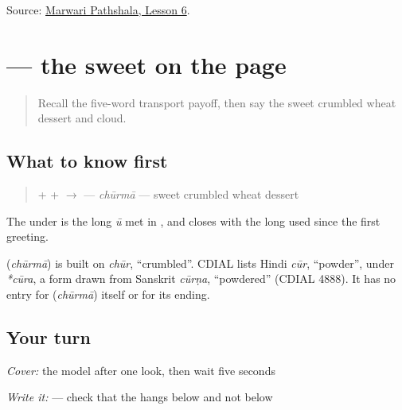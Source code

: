 \begin{tcolorbox}[breakable,colback=teal!4,colframe=teal!35!black,title={Before you move on}]
Source: \href{https://www.marwaripathshala.com/marwari-lesson-6-english}{Marwari Pathshala, Lesson 6}.
\end{tcolorbox}
\section[\texorpdfstring{\mw{चूरमा} (chūrmā)}{चूरमा (chūrmā)}]{ — the sweet on the page}

\label{lesson:MW-C20-churma}



\begin{quote}
Recall the five-word transport payoff, then say the sweet crumbled wheat dessert and cloud.
\end{quote}

\subsection*{What to know first}
\begin{quote}
\textbf{} + \textbf{} + \textbf{} $\to$ \textbf{} — \emph{chūrmā} — sweet crumbled wheat dessert
\end{quote}

The \textbf{} under \textbf{} is the long \emph{ū} met in \textbf{}, and \textbf{} closes with the long \textbf{} used since the first greeting.

\begin{cousinweb}
\textbf{} (\emph{chūrmā}) is built on \emph{chūr}, \textquotedblleft{}crumbled\textquotedblright{}. CDIAL lists Hindi \emph{cūr}, \textquotedblleft{}powder\textquotedblright{}, under \emph{*cūra}, a form drawn from Sanskrit \emph{cūrṇa}, \textquotedblleft{}powdered\textquotedblright{} (CDIAL 4888). It has no entry for \textbf{} (\emph{chūrmā}) itself or for its ending.
\end{cousinweb}

\subsection*{Your turn}
\emph{Cover:} the model after one look, then wait five seconds

\emph{Write it:} \textbf{} — check that the \textbf{} hangs below \textbf{} and not below \textbf{}


